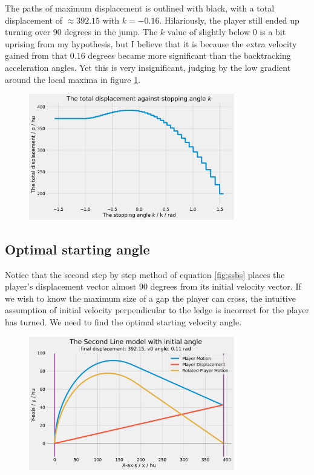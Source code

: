 The paths of maximum displacement is outlined with black, with a total displacement of $\approx 392.15$ with $k=-0.16$. Hilariously, the player still ended up turning over 90 degrees in the jump. The $k$ value of slightly below $0$ is a bit uprising from my hypothesis, but I believe that it is because the extra velocity gained from that $0.16$ degrees became more significant than the backtracking acceleration angles. Yet this is very insignificant, judging by the low gradient around the local maxima in figure \ref{fig:sbs2k}.

\begin{figure}[H]
    \centering
    \includegraphics[width=0.8\textwidth]{assets/step_by_step_2k.png}
    \caption{}
    \label{fig:sbs2k}
\end{figure}


\subsection{Optimal starting angle}
Notice that the second step by step method of equation \ref{fig:ssbs} places the player's displacement vector almost 90 degrees from its initial velocity vector. If we wish to know the maximum size of a gap the player can cross, the intuitive assumption of initial velocity perpendicular to the ledge is incorrect for the player has turned. We need to find the optimal starting velocity angle.


\begin{figure}[H]
    \centering
    \includegraphics[width=0.8\textwidth]{assets/step_by_step_edge.png}
    \caption{}
    \label{fig:sbsedge}
\end{figure}


